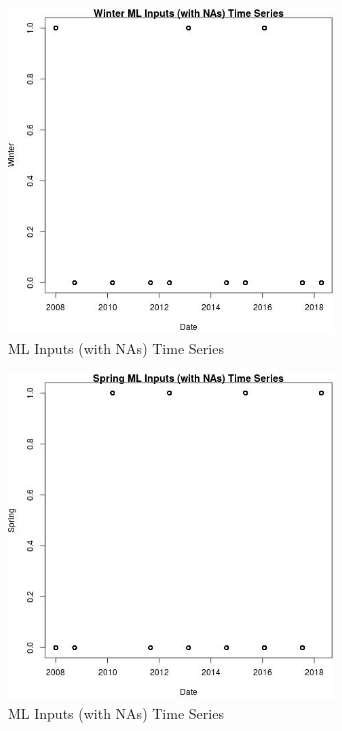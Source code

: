 \begin{figure} 
\centering  
\includegraphics[width=0.77\textwidth]{Code_Outputs/Report_ML_input_PM25_Step4_part_e_de_duplicated_aves_compiled_2019-05-18wNAs_WintervDate.jpg} 
\caption{\label{fig:Report_ML_input_PM25_Step4_part_e_de_duplicated_aves_compiled_2019-05-18wNAsWintervDate}ML Inputs (with NAs) Time Series} 
\end{figure} 
 

\begin{figure} 
\centering  
\includegraphics[width=0.77\textwidth]{Code_Outputs/Report_ML_input_PM25_Step4_part_e_de_duplicated_aves_compiled_2019-05-18wNAs_SpringvDate.jpg} 
\caption{\label{fig:Report_ML_input_PM25_Step4_part_e_de_duplicated_aves_compiled_2019-05-18wNAsSpringvDate}ML Inputs (with NAs) Time Series} 
\end{figure} 
 

